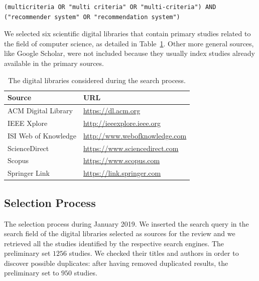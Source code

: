 \begin{lstlisting}
(multicriteria OR "multi criteria" OR "multi-criteria") AND ("recommender system" OR "recommendation system")
\end{lstlisting}

We selected six scientific digital libraries that contain primary studies related to the field of computer science, as detailed in Table~\ref{mcr:tab:sources}. Other more general sources, like Google Scholar, were not included because they usually index studies already available in the primary sources.

\begin{table}
\centering
\begin{tabular}{@{}ll@{}}
\toprule
Source               & URL                                 \\ \midrule
ACM Digital Library  & \url{https://dl.acm.org}            \\
IEEE Xplore          & \url{http://ieeexplore.ieee.org}    \\
ISI Web of Knowledge & \url{http://www.webofknowledge.com} \\
ScienceDirect        & \url{https://www.sciencedirect.com} \\
Scopus               & \url{https://www.scopus.com}        \\
Springer Link        & \url{https://link.springer.com}     \\ \bottomrule
\end{tabular}
\caption[Digital libraries considered]{The digital libraries considered during the search process.}
\label{mcr:tab:sources}
\end{table}

\subsection{Selection Process}

The selection process  during January 2019. We inserted the search query in the search field of the digital libraries selected as sources for the review and we retrieved all the studies identified by the respective search engines.  The preliminary set  $1256$ studies. We checked their titles and authors in order to discover possible duplicates: after having removed duplicated results, the preliminary set  to $950$ studies.

